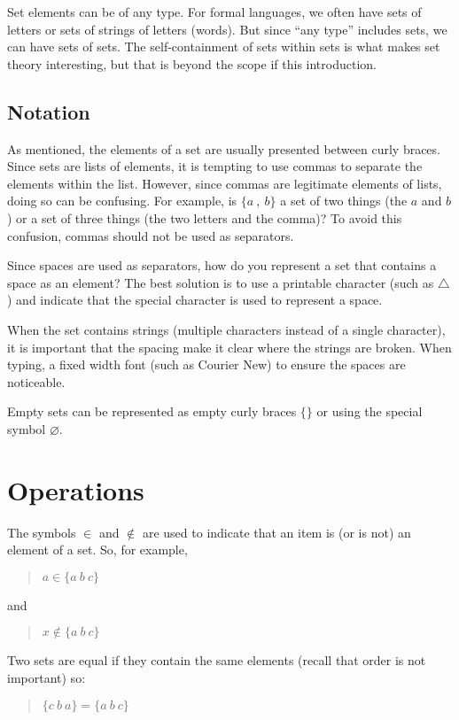 \documentclass[letterpaper,12pt,openany,reqno]{book}%
\begin{document}
Set elements can be of any type. For formal languages, we often have sets of letters or sets of strings of letters (words). But since ``any type'' includes sets, we can have sets of sets. The self-containment of sets within sets is what makes set theory interesting, but that is beyond the scope if this introduction.

\subsection{Notation}
As mentioned, the elements of a set are usually presented between curly braces. Since sets are lists of elements, it is tempting to use commas to separate the elements within the list. However, since commas are legitimate elements of lists, doing so can be confusing. For example, is $\{a\ ,\ b\}$ a set of two things (the $a$ and $b$) or a set of three things (the two letters and the comma)? To avoid this confusion, commas should not be used as separators. 

Since spaces are used as separators, how do you represent a set that contains a space as an element? The best solution is to use a printable character (such as $\triangle$) and indicate that the special character is used to represent a space.

When the set contains strings (multiple characters instead of a single character), it is important that the spacing make it clear where the strings are broken. When typing, a fixed width font (such as Courier New) to ensure the spaces are noticeable. 

Empty sets can be represented as empty curly braces $\{\}$ or using the special symbol $\varnothing$.

\section{Operations}
The symbols $\in$ and $\notin$ are used to indicate that an item is (or is not) an element of a set. So, for example,
\begin{quote}
$a \in \{ a \ b \ c\}$
\end{quote}
and
\begin{quote}
$x \notin \{ a \ b \ c\}$
\end{quote}

Two sets are equal if they contain the same elements (recall that order is not important) so:
\begin{quote}
$\{ c \ b \ a\} = \{ a \ b \ c\}$
\end{quote}
\end{document}
